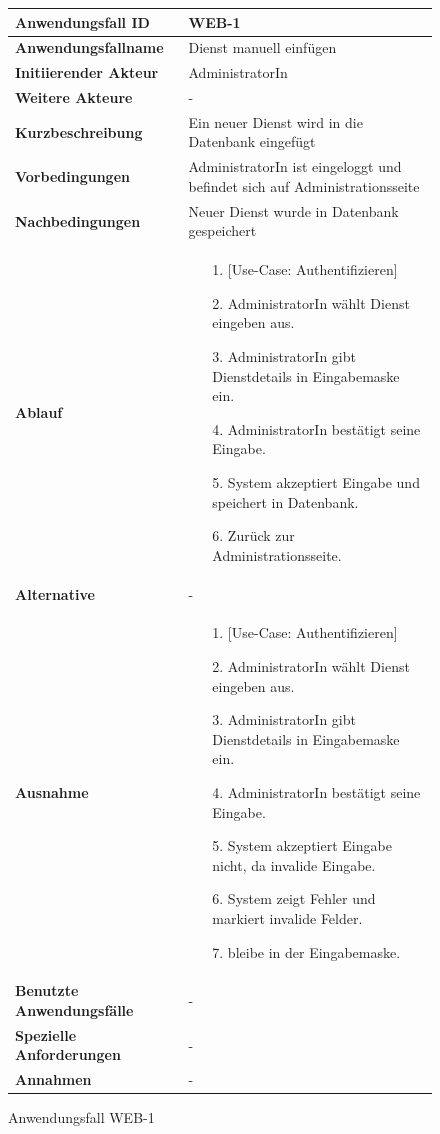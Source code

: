 \begin{figure}[h]
	\centering
	\begin{tabularx}{\textwidth}{ X | X }
		\textbf{Anwendungsfall ID} & WEB-1 \\ \hline
		\textbf{Anwendungsfallname} & Dienst manuell einfügen \\ \hline
		\textbf{Initiierender Akteur} & AdministratorIn \\ \hline
		\textbf{Weitere Akteure} & - \\ \hline
		\textbf{Kurzbeschreibung} & Ein neuer Dienst wird in die Datenbank eingefügt \\ \hline
		\textbf{Vorbedingungen} & AdministratorIn ist eingeloggt und befindet sich auf Administrationsseite \\ \hline
		\textbf{Nachbedingungen} & Neuer Dienst wurde in Datenbank gespeichert \\ \hline
		\textbf{Ablauf} &
		\begin{enumerate}
			\item [1.] [Use-Case: Authentifizieren]
			\item [2.] AdministratorIn wählt Dienst eingeben aus.
			\item [3.] AdministratorIn gibt Dienstdetails in Eingabemaske ein.
			\item [4.] AdministratorIn bestätigt seine Eingabe.
			\item [5.] System akzeptiert Eingabe und speichert in Datenbank.
			\item [6.] Zurück zur Administrationsseite.
		\end{enumerate} \\ \hline
		\textbf{Alternative} & - \\ \hline
		\textbf{Ausnahme} &
		\begin{enumerate}
			\item [1.] [Use-Case: Authentifizieren]
			\item [2.] AdministratorIn wählt Dienst eingeben aus.
			\item [3.] AdministratorIn gibt Dienstdetails in Eingabemaske ein.
			\item [4.] AdministratorIn bestätigt seine Eingabe.
			\item [5.] System akzeptiert Eingabe nicht, da invalide Eingabe.
			\item [6.] System zeigt Fehler und markiert invalide Felder.
			\item [7.] bleibe in der Eingabemaske.
		\end{enumerate} \\ \hline
		\textbf{Benutzte Anwendungsfälle} & - \\ \hline
		\textbf{Spezielle Anforderungen} & - \\ \hline
		\textbf{Annahmen} & -
	\end{tabularx}
	\caption{Anwendungsfall WEB-1}
	\label{fig:anwendungsfall-server-tabelle-web-1}
\end{figure}

